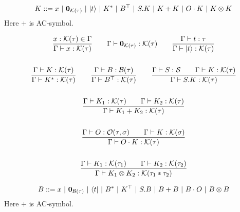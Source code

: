 \begin{definition}
\begin{definition}
  \begin{align*}
    K ::= x\ |\ \zeroK{\tau}\ |\ \ket{t}\ |\ K^*\ |\ B^\top\ |\ S.K\ |\ K + K\ |\ O \cdot K\ |\ K \otimes K
  \end{align*}
  Here $+$ is AC-symbol.
\end{definition}


\begin{definition}
  \begin{gather*}
    \frac{x : \mathcal{K}(\tau) \in \Gamma}{\Gamma \vdash x : \mathcal{K}(\tau)}
    \qquad
    \Gamma \vdash \mathbf{0}_{\mathcal{K}(\tau)} : \mathcal{K}(\tau)
    \qquad
    \frac{\Gamma \vdash t : \tau}{\Gamma \vdash |t\rangle : \mathcal{K}(\tau)} \\
    \\
    \frac{\Gamma \vdash K : \mathcal{K}(\tau)}{\Gamma \vdash K^* : \mathcal{K}(\tau)}
    \qquad
    \frac{\Gamma \vdash B : \mathcal{B}(\tau)}{\Gamma \vdash B^\top : \mathcal{K}(\tau)}
    \qquad
    \frac{\Gamma \vdash S : \mathcal{S} \qquad \Gamma \vdash K : \mathcal{K}(\tau)}{\Gamma \vdash S.K : \mathcal{K}(\tau)} \\
    \\
    \frac{\Gamma \vdash K_1 : \mathcal{K}(\tau) \qquad \Gamma \vdash K_2 : \mathcal{K}(\tau)}{\Gamma \vdash K_1 + K_2 : \mathcal{K}(\tau)} \\
    \\
    \frac{\Gamma \vdash O : \mathcal{O}(\tau, \sigma) \qquad \Gamma \vdash K : \mathcal{K}(\sigma)}{\Gamma \vdash O \cdot K : \mathcal{K}(\tau)} \\
    \\
    \frac{\Gamma \vdash K_1 : \mathcal{K}(\tau_1) \qquad \Gamma \vdash K_2 : \mathcal{K}(\tau_2)}{\Gamma \vdash K_1 \otimes K_2 : \mathcal{K}(\tau_1 * \tau_2)}
  \end{gather*}
\end{definition}


\begin{definition}
  \begin{align*}
    B ::= x\ |\ \zeroB{\tau}\ |\ \bra{t}\ |\ B^*\ |\ K^\top\ |\ S.B\ |\ B + B\ |\ B \cdot O\ |\ B \otimes B
  \end{align*}
  Here $+$ is AC-symbol.
\end{definition}



\end{definition}
